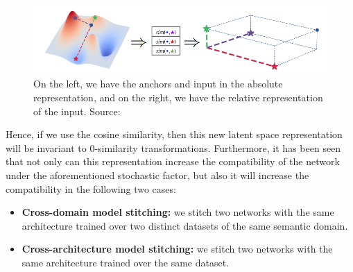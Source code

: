 \documentclass[../main.tex]{subfiles}
\begin{document}
\begin{figure}[!ht]
    \centering
    \includegraphics[width=\textwidth]{figures/bg/relativeSche.png} 
    \caption{On the left, we have the anchors and input in the absolute representation, and on the right, we have the relative representation of the input. Source: \cite{moschella_relative_2022}}
    \label{fig:relativeSche}
\end{figure}

Hence, if we use the cosine similarity, then this new latent space representation will be invariant to $0$-similarity transformations. Furthermore, it has been seen that not only can this representation increase the compatibility of the network under the aforementioned stochastic factor, but also it will increase the compatibility in the following two cases:

\begin{itemize}
    \item \textbf{Cross-domain model stitching:} we stitch two networks with the same architecture trained over two distinct datasets of the same semantic domain.
    \item \textbf{Cross-architecture model stitching:} we stitch two networks with the same architecture trained over the same dataset.
\end{itemize}
\end{document}
